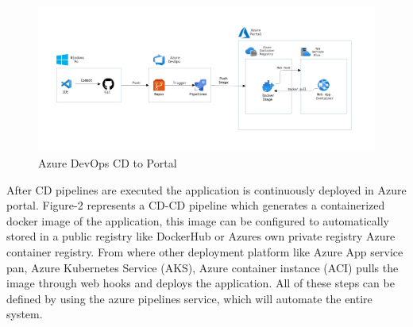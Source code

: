 \begin{figure}[h]
    \centering
    \includegraphics[width=14cm]{images/Azure_pipeline_diagram_CD.png}
    \caption{Azure DevOps CD to Portal}
    \label{fig:azure-devops-ci-cd-pipeline-workflow}
\end{figure}

After CD pipelines are executed the application is continuously deployed in Azure portal. Figure-2 represents a CD-CD pipeline which generates a containerized docker image of the application, this image can be configured to automatically stored in a public registry like DockerHub or Azures own private registry Azure container registry. From where other deployment platform like Azure App service pan, Azure Kubernetes Service (AKS), Azure container instance (ACI) pulls the image through web hooks and deploys the application. All of these steps can be defined by using the azure pipelines service, which will automate the entire system. 
%

